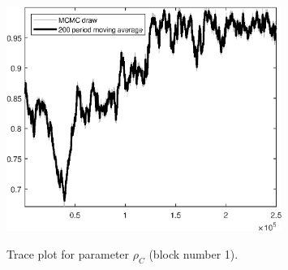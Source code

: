 \begin{figure}[H]
\centering
  \includegraphics[width=0.8\textwidth]{BRS_growth_ext_comovement/graphs/TracePlot_rho_C_blck_1}\\
    \caption{Trace plot for parameter ${\rho_C}$ (block number 1).}
\end{figure}
